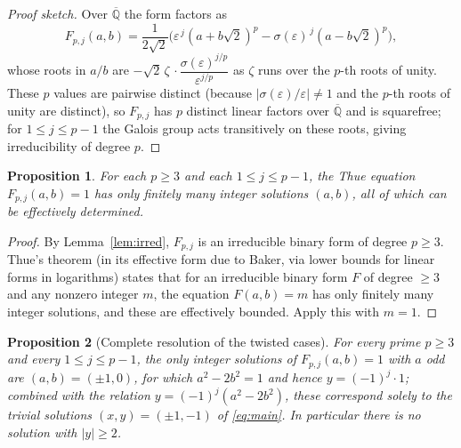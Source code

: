 \documentclass{amsart}
\newtheorem{proposition}{Proposition}
\theoremstyle{definition}
\begin{document}
\begin{proof}[Proof sketch]
Over $\overline{\mathbb Q}$ the form factors as
\[
F_{p,j}(a,b)=\frac{1}{2\sqrt2}\Big(\varepsilon^{\,j}(a+b\sqrt2)^{p}
-\sigma(\varepsilon)^{\,j}(a-b\sqrt2)^{p}\Big),
\]
whose roots in $a/b$ are
$-\sqrt2\,\zeta\,\cdot\dfrac{\sigma(\varepsilon)^{j/p}}{\varepsilon^{j/p}}$ as
$\zeta$ runs over the $p$-th roots of unity. These $p$ values are pairwise
distinct (because $|\sigma(\varepsilon)/\varepsilon|\neq1$ and the $p$-th roots
of unity are distinct), so $F_{p,j}$ has $p$ distinct linear factors over
$\overline{\mathbb Q}$ and is squarefree; for $1\le j\le p-1$ the Galois group
acts transitively on these roots, giving irreducibility of degree $p$.
\end{proof}

\begin{proposition}\label{prop:thuefinite}
For each $p\ge 3$ and each $1\le j\le p-1$, the Thue equation
$F_{p,j}(a,b)=1$ has only finitely many integer solutions $(a,b)$, all of which
can be effectively determined.
\end{proposition}

\begin{proof}
By Lemma~\ref{lem:irred}, $F_{p,j}$ is an irreducible binary form of degree
$p\ge 3$. Thue's theorem (in its effective form due to Baker, via lower bounds
for linear forms in logarithms) states that for an irreducible binary form $F$
of degree $\ge 3$ and any nonzero integer $m$, the equation $F(a,b)=m$ has only
finitely many integer solutions, and these are effectively bounded. Apply this
with $m=1$.
\end{proof}

\begin{proposition}[Complete resolution of the twisted cases]\label{prop:resolve}
For every prime $p\ge 3$ and every $1\le j\le p-1$, the only integer solutions
of $F_{p,j}(a,b)=1$ with $a$ odd are $(a,b)=(\pm1,0)$, for which
$a^2-2b^2=1$ and hence $y=(-1)^{j}\cdot1$; combined with the relation
$y=(-1)^j(a^2-2b^2)$, these correspond solely to the trivial solutions
$(x,y)=(\pm1,-1)$ of \eqref{eq:main}. In particular there is no solution with
$|y|\ge2$.
\end{proposition}
\end{document}
